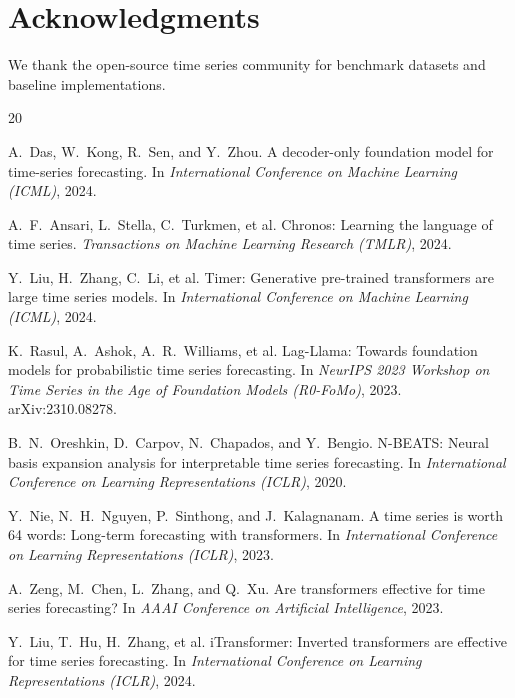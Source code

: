 \documentclass[11pt]{article}
\begin{document}
\section*{Acknowledgments}
We thank the open-source time series community for benchmark datasets and baseline implementations.

\begin{thebibliography}{20}

A.~Das, W.~Kong, R.~Sen, and Y.~Zhou.
\newblock A decoder-only foundation model for time-series forecasting.
\newblock In \emph{International Conference on Machine Learning (ICML)}, 2024.

A.~F.~Ansari, L.~Stella, C.~Turkmen, et al.
\newblock Chronos: Learning the language of time series.
\newblock \emph{Transactions on Machine Learning Research (TMLR)}, 2024.

Y.~Liu, H.~Zhang, C.~Li, et al.
\newblock Timer: Generative pre-trained transformers are large time series models.
\newblock In \emph{International Conference on Machine Learning (ICML)}, 2024.

K.~Rasul, A.~Ashok, A.~R.~Williams, et al.
\newblock Lag-Llama: Towards foundation models for probabilistic time series forecasting.
\newblock In \emph{NeurIPS 2023 Workshop on Time Series in the Age of Foundation Models (R0-FoMo)}, 2023. arXiv:2310.08278.

B.~N.~Oreshkin, D.~Carpov, N.~Chapados, and Y.~Bengio.
\newblock N-BEATS: Neural basis expansion analysis for interpretable time series forecasting.
\newblock In \emph{International Conference on Learning Representations (ICLR)}, 2020.

Y.~Nie, N.~H.~Nguyen, P.~Sinthong, and J.~Kalagnanam.
\newblock A time series is worth 64 words: Long-term forecasting with transformers.
\newblock In \emph{International Conference on Learning Representations (ICLR)}, 2023.

A.~Zeng, M.~Chen, L.~Zhang, and Q.~Xu.
\newblock Are transformers effective for time series forecasting?
\newblock In \emph{AAAI Conference on Artificial Intelligence}, 2023.

Y.~Liu, T.~Hu, H.~Zhang, et al.
\newblock iTransformer: Inverted transformers are effective for time series forecasting.
\newblock In \emph{International Conference on Learning Representations (ICLR)}, 2024.


\end{thebibliography}
\end{document}
